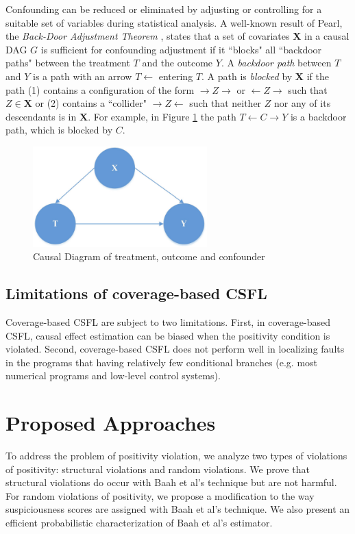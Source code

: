 Confounding can be reduced or eliminated by adjusting or controlling for a suitable set of variables during statistical analysis.  A well-known result of Pearl, the {\it Back-Door Adjustment Theorem} \cite{pearl2000models}, states that a set of covariates $\mathbf{X}$ in a causal DAG $G$ is sufficient for confounding adjustment if it ``blocks" all ``backdoor paths" between the treatment $T$ and the outcome $Y$.  A {\it backdoor path} between $T$ and $Y$ is a path with an arrow $T \leftarrow$ entering $T$.  A path is {\it blocked} by $\pmb{X}$ if the path (1) contains a configuration of the form $\rightarrow Z \rightarrow$ or $\leftarrow Z \rightarrow$ such that  $Z \in \mathbf{X}$ or (2) contains a ``collider" $\rightarrow Z \leftarrow$  such that neither $Z$ nor any of its descendants is in $\mathbf{X}$.  For example, in Figure \ref{fig2.2} the path $T \leftarrow C \rightarrow Y$ is a backdoor path, which is blocked by $C$.

\begin{figure}[htb!]
\vspace{0em}
\begin{center}
\includegraphics[width=0.6\textwidth]{chapter2_CausalDAG1.pdf}
\vspace {0em}\caption{Causal Diagram of treatment, outcome and confounder} \label{fig2.2}
\end{center}
\vspace {0em}
\end{figure}

\subsection{Limitations of coverage-based CSFL}
Coverage-based CSFL are subject to two limitations. First, in coverage-based CSFL, causal effect estimation can be biased when the positivity condition is violated.  Second,  coverage-based CSFL does not perform well in localizing faults in the programs that having relatively few conditional branches (e.g. most numerical programs and low-level control systems). 

\section {Proposed Approaches}
To address the problem of positivity violation, we analyze two types of violations of positivity: structural violations and random violations. We prove that structural violations do occur with Baah et al's technique but are not harmful. For random violations of positivity, we propose a modification to the way suspiciousness scores are assigned with Baah et al's technique. We also present an efficient probabilistic characterization of Baah et al's estimator.

